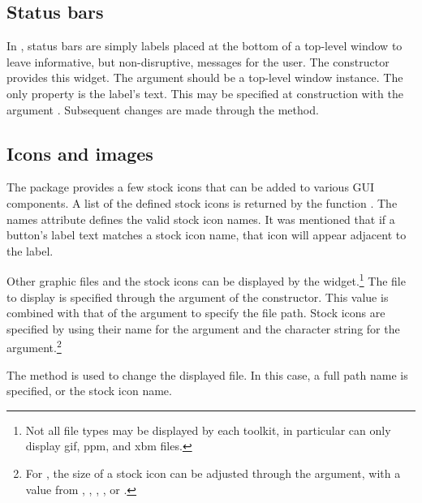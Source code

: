 \subsection{Status bars}
\label{sec:gWidgets-statusbars}

In , status bars are simply labels placed at the bottom of a
top-level window to leave informative, but non-disruptive, messages
for the user.  The  constructor provides this
widget.  The  argument should be a top-level window
instance.  The only property is the label's text. This may be
specified at construction with the argument
. Subsequent changes are made through the
 method.




\subsection{Icons and images}
\label{sec:gWidgets-displ-icons-imag}

The  package provides a few stock icons that can be
added to various GUI components. A list of the defined stock icons is
returned by the function .  The names attribute
defines the valid stock icon names. It was mentioned that if a
button's label text matches a stock icon name, that icon will appear
adjacent to the label.



Other graphic files and the stock icons can be displayed by the
 widget.\footnote{Not all file types may be
  displayed by each toolkit, in particular  can
  only display gif, ppm, and xbm files.} The file to display is
specified through the  argument of the
constructor. This value is combined with that of the
 argument to specify the file path.  Stock
icons are specified by using their name for the 
argument and the character string  for the
 argument.\footnote{For , the size
  of a stock icon can be adjusted through the 
  argument, with a value from , ,
  , , or .}

The  method is used to change the
displayed file. In this case, a full path name is specified, or the
stock icon name.

